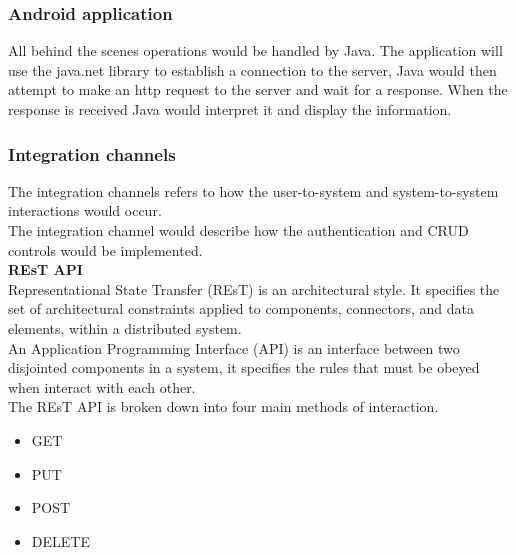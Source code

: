 \documentclass{article}
\begin{document}
\subsubsection*{Android application}
All behind the scenes operations would be handled by Java. The application will use the java.net library to establish a connection to the server, Java would then attempt to make an http request to the server and wait for a response. When the response is received Java would interpret it and display the information.

\subsubsection{Integration channels}
The integration channels refers to how the user-to-system and system-to-system interactions would occur.\\
The integration channel would describe how the authentication and CRUD controls would be implemented.\\

\textbf{REsT API}\\
Representational State Transfer (REsT) is an architectural style. It specifies the set of architectural constraints applied to components, connectors, and data elements, within a distributed system.\\
An Application Programming Interface (API) is an interface between two disjointed components in a system, it specifies the rules that must be obeyed when interact with each other.\\
The REsT API is broken down into four main methods of interaction. 
\begin{itemize}
	\item GET
	\item PUT
	\item POST
	\item DELETE
\end{itemize}
\end{document}
